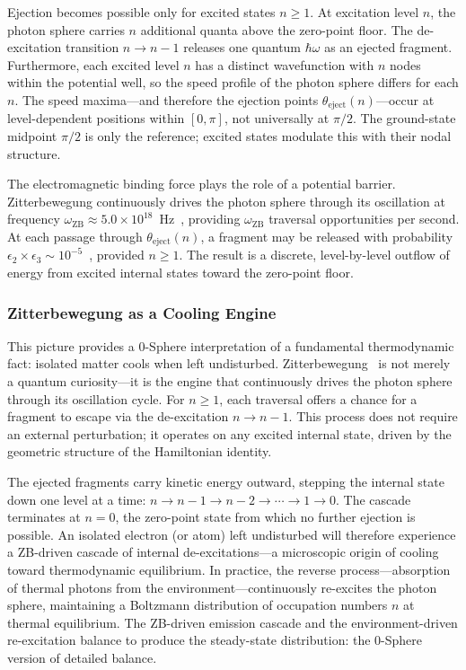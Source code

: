\documentclass[%
 reprint, amsmath,amssymb, aps, prb, ]{revtex4-2}
\numberwithin{equation}{section}
\newcommand{\iphase}{\theta}
\newcommand{\omZB}{\omega_{\text{ZB}}}
\begin{document}
Ejection becomes possible only for excited states $n \geq 1$. At excitation level $n$, the photon sphere carries $n$ additional quanta above the zero-point floor. The de-excitation transition $n \to n-1$ releases one quantum $\hbar\omega$ as an ejected fragment. Furthermore, each excited level $n$ has a distinct wavefunction with $n$ nodes within the potential well, so the speed profile of the photon sphere differs for each $n$. The speed maxima---and therefore the ejection points $\iphase_{\text{eject}}(n)$---occur at level-dependent positions within $[0, \pi]$, not universally at $\pi/2$. The ground-state midpoint $\pi/2$ is only the reference; excited states modulate this with their nodal structure.

The electromagnetic binding force plays the role of a potential barrier. Zitterbewegung continuously drives the photon sphere through its oscillation at frequency $\omZB \approx 5.0 \times 10^{18}$~Hz~\cite{hanamura48}, providing $\omZB$ traversal opportunities per second. At each passage through $\iphase_{\text{eject}}(n)$, a fragment may be released with probability $\epsilon_2 \times \epsilon_3 \sim 10^{-5}$~\cite{hanamura34}, provided $n \geq 1$. The result is a discrete, level-by-level outflow of energy from excited internal states toward the zero-point floor.

\clearpage

\subsubsection{Zitterbewegung as a Cooling Engine}
\label{sec:ejection_zb}

This picture provides a 0-Sphere interpretation of a fundamental thermodynamic fact: isolated matter cools when left undisturbed. Zitterbewegung~\cite{Schrodinger1930,Dirac1928} is not merely a quantum curiosity---it is the engine that continuously drives the photon sphere through its oscillation cycle. For $n \geq 1$, each traversal offers a chance for a fragment to escape via the de-excitation $n \to n-1$. This process does not require an external perturbation; it operates on any excited internal state, driven by the geometric structure of the Hamiltonian identity.

The ejected fragments carry kinetic energy outward, stepping the internal state down one level at a time: $n \to n-1 \to n-2 \to \cdots \to 1 \to 0$. The cascade terminates at $n=0$, the zero-point state from which no further ejection is possible. An isolated electron (or atom) left undisturbed will therefore experience a ZB-driven cascade of internal de-excitations---a microscopic origin of cooling toward thermodynamic equilibrium. In practice, the reverse process---absorption of thermal photons from the environment---continuously re-excites the photon sphere, maintaining a Boltzmann distribution of occupation numbers $n$ at thermal equilibrium. The ZB-driven emission cascade and the environment-driven re-excitation balance to produce the steady-state distribution: the 0-Sphere version of detailed balance. 
\end{document}
